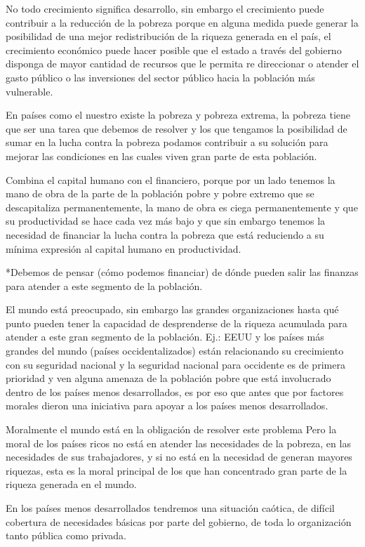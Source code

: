 \documentclass[
  a4paper,
]{article}
\begin{document}
No todo crecimiento significa desarrollo, sin embargo el crecimiento
puede contribuir a la reducción de la pobreza porque en alguna medida
puede generar la posibilidad de una mejor redistribución de la riqueza
generada en el país, el crecimiento económico puede hacer posible que el
estado a través del gobierno disponga de mayor cantidad de recursos que
le permita re direccionar o atender el gasto público o las inversiones
del sector público hacia la población más vulnerable.

En países como el nuestro existe la pobreza y pobreza extrema, la
pobreza tiene que ser una tarea que debemos de resolver y los que
tengamos la posibilidad de sumar en la lucha contra la pobreza podamos
contribuir a su solución para mejorar las condiciones en las cuales
viven gran parte de esta población.

Combina el capital humano con el financiero, porque por un lado tenemos
la mano de obra de la parte de la población pobre y pobre extremo que se
descapitaliza permanentemente, la mano de obra es ciega permanentemente
y que su productividad se hace cada vez más bajo y que sin embargo
tenemos la necesidad de financiar la lucha contra la pobreza que está
reduciendo a su mínima expresión al capital humano en productividad.

*Debemos de pensar (cómo podemos financiar) de dónde pueden salir las
finanzas para atender a este segmento de la población.

El mundo está preocupado, sin embargo las grandes organizaciones hasta
qué punto pueden tener la capacidad de desprenderse de la riqueza
acumulada para atender a este gran segmento de la población. Ej.: EEUU y
los países más grandes del mundo (países occidentalizados) están
relacionando su crecimiento con su seguridad nacional y la seguridad
nacional para occidente es de primera prioridad y ven alguna amenaza de
la población pobre que está involucrado dentro de los países menos
desarrollados, es por eso que antes que por factores morales dieron una
iniciativa para apoyar a los países menos desarrollados.

Moralmente el mundo está en la obligación de resolver este problema Pero
la moral de los países ricos no está en atender las necesidades de la
pobreza, en las necesidades de sus trabajadores, y si no está en la
necesidad de generan mayores riquezas, esta es la moral principal de los
que han concentrado gran parte de la riqueza generada en el mundo.

En los países menos desarrollados tendremos una situación caótica, de
difícil cobertura de necesidades básicas por parte del gobierno, de toda
lo organización tanto pública como privada.
\end{document}
